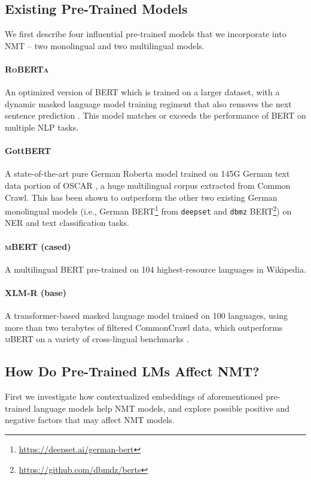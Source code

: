 \documentclass[11pt]{article}
\begin{document}
\subsection{Existing Pre-Trained Models}
We first describe four influential pre-trained models that we incorporate into NMT -- two monolingual and two multilingual models.

\paragraph{\textsc{RoBERTa}}
An optimized version of BERT which is trained on a larger dataset, with a dynamic masked language model training regiment that also removes the next sentence prediction \citep{liu2019roberta}. This model matches or exceeds the performance of BERT on multiple NLP tasks.

\paragraph{GottBERT} A state-of-the-art pure German Roberta model  \citep{scheible2020gottbert} trained on 145G German text data portion of OSCAR \citep{ortiz-suarez-etal-2020-monolingual}, a huge multilingual corpus extracted from Common Crawl. This has been shown to outperform the other two existing German monolingual models (i.e., German BERT\footnote{\url{https://deepset.ai/german-bert}} from \texttt{deepset} and \texttt{dbmz} BERT\footnote{\url{https://github.com/dbmdz/berts}}) on NER and text classification tasks.

\paragraph{\textsc{mBERT} (cased)}
A multilingual \textsc{BERT} \citep{devlin-etal-2019-bert} pre-trained on 104 highest-resource languages in Wikipedia.



\paragraph{\textsc{XLM-R} (base)} A transformer-based \cite{NIPS2017_3f5ee243} masked language model trained on 100 languages, using more than two terabytes of filtered CommonCrawl data, which outperforms \textsc{mBERT} on a variety of cross-lingual benchmarks \citep{conneau2020unsupervised}.


\subsection{How Do Pre-Trained LMs Affect NMT?}
\label{sec:affect}
First we investigate how contextualized embeddings of aforementioned pre-trained language models help NMT models, and explore possible positive and negative factors that may affect NMT models.
\end{document}
